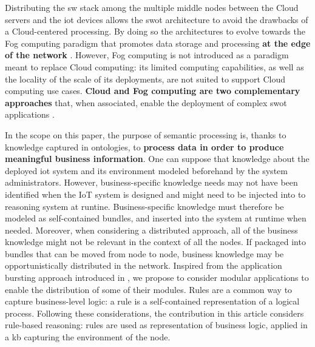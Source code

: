 \documentclass{iosart2c}
\begin{document}
Distributing the \gls{sw} stack among the multiple middle nodes between the Cloud servers and the \gls{iot} devices allows the \gls{swot} architecture to avoid the drawbacks of a Cloud-centered processing.
By doing so the architectures to evolve towards the Fog computing paradigm \cite{Bonomi2012} that promotes data storage and processing \textbf{at the edge of the network} \cite{Patel2017}.
However, Fog computing is not introduced as a paradigm meant to replace Cloud computing: its limited computing capabilities, as well as the locality of the scale of its deployments, are not suited to support Cloud computing use cases.
\textbf{Cloud and Fog computing are two complementary approaches} that, when associated, enable the deployment of complex \gls{swot} applications \cite{Sahni2017}.

In the scope on this paper, the  purpose of semantic processing is, thanks to knowledge captured in ontologies, to \textbf{process data in order to produce meaningful business information}. 
One can suppose that knowledge about the deployed \gls{iot} system and its environment modeled beforehand by the system administrators.
However, business-specific knowledge needs may not have been identified when the IoT system is designed and might need to be injected into to reasoning system at runtine.
Business-specific knowledge must therefore be modeled as self-contained bundles, and inserted into the system at runtime when needed.
Moreover, when considering a distributed approach, all of the business knowledge might not be relevant in the context of all the nodes. 
If packaged into bundles that can be moved from node to node, business knowledge may be opportunistically distributed in the network. 
Inspired from the application bursting approach introduced in \cite{Charrada2016}, we propose to consider modular applications to enable the distribution of some of their modules.
Rules are a common way to capture business-level logic: a rule is a self-contained representation of a logical process.
Following these considerations, the contribution in this article considers rule-based reasoning: rules are used as representation of business logic, applied in a \gls{kb} capturing the environment of the node.
\end{document}

